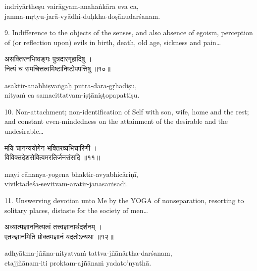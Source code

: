 \begin{transliteration}
indriyārtheṣu vairāgyam-anahaṅkāra eva ca, \\
janma-mṛtyu-jarā-vyādhi-duḥkha-doṣānudarśanam.
\end{transliteration}

9. Indifference to the objects of the senses, and also absence of egoism,
perception of (or reflection upon) evils in birth, death, old age, sickness and
pain\ldots

\begin{gitaverse}
असक्तिरनभिष्वङ्गः पुत्रदारगृहादिषु । \\
नित्यं च समचित्तत्वमिष्टानिष्टोपपत्तिषु ॥१०॥
\end{gitaverse}

\begin{transliteration}
asaktir-anabhiṣvaṅgaḥ putra-dāra-gṛhādiṣu, \\
nityaṁ ca samacittatvam-iṣṭāniṣṭopapattiṣu.
\end{transliteration}

10. Non-attachment; non-identification of Self with son, wife, home and the
rest; and constant even-mindedness on the attainment of the desirable and the
undesirable\ldots

\begin{gitaverse}
मयि चानन्ययोगेन भक्तिरव्यभिचारिणी । \\
विविक्तदेशसेवित्वमरतिर्जनसंसदि ॥११॥
\end{gitaverse}

\begin{transliteration}
mayi cānanya-yogena bhaktir-avyabhicāriṇī, \\
viviktadeśa-sevitvam-aratir-janasaṁsadi.
\end{transliteration}

11. Unswerving devotion unto Me by the YOGA of nonseparation, resorting to
solitary places, distaste for the society of men\ldots

\begin{gitaverse}
अध्यात्मज्ञाननित्यत्वं तत्त्वज्ञानार्थदर्शनम् । \\
एतज्ज्ञानमिति प्रोक्तमज्ञानं यदतोऽन्यथा ॥१२॥
\end{gitaverse}

\begin{transliteration}
adhyātma-jñāna-nityatvaṁ tattva-jñānārtha-darśanam, \\
etajjñānam-iti proktam-ajñānaṁ yadato'nyathā.
\end{transliteration}

